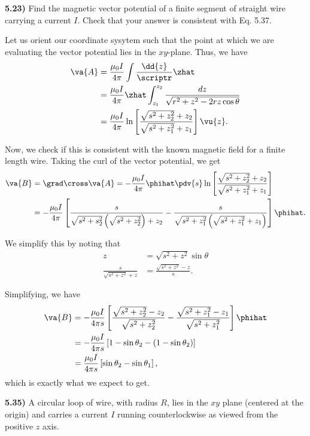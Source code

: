 \documentclass[12pt,a4paper]{article}
\newcommand{\prob}[2]{\textbf{#1)} #2}
\begin{document}
\prob{5.23}{Find the magnetic vector potential of a finite segment of straight wire carrying a current $I$. Check that your answer is consistent with Eq. 5.37.}

Let us orient our coordinate sysytem such that the point at which we are evaluating the vector potential lies in the $xy$-plane.
Thus, we have
\begin{align*}
    \va{A} &= \frac{\mu_0 I}{4 \pi} \int \frac{\dd{z}}{\scriptr} \zhat \\
           &= \frac{\mu_0 I}{4 \pi} \zhat \int_{z_1}^{z_2} \frac{dz}{\sqrt{r^2 + z^2 - 2rz\cos{\theta}}} \\
           &= \frac{\mu_0 I}{4 \pi}\ln\left[ \frac{\sqrt{s^2 + z_2^2} + z_2}{\sqrt{s^2 + z_1^2} + z_1} \right] \vu{z}
.\end{align*}

Now, we check if this is consistent with the known magnetic field for a finite length wire.
Taking the curl of the vector potential, we get
\begin{align*}
    \va{B} &= \grad \cross \va{A} = -\frac{\mu_0 I}{4 \pi} \phihat \pdv{s} \ln\left[ \frac{\sqrt{s^2 + z_2^2} + z_2}{\sqrt{s^2 + z_1^2} + z_1} \right] \\
           &= -\frac{\mu_0 I}{4 \pi}\left[ \frac{s}{\sqrt{s^2 + s_2^2}\left( \sqrt{s^2 + z_2^2} \right) + z_2} - \frac{s}{\sqrt{s^2 + z_1^2}\left( \sqrt{s^2 + z_1^2} + z_1 \right)} \right] \phihat
.\end{align*}

We simplify this by noting that 
\begin{align*}
    z &= \sqrt{s^2 + z^2}\sin{\theta} \\
    \frac{s}{\sqrt{s^2 + z^2} + z} &= \frac{\sqrt{s^2 + z^2} - z}{s}
.\end{align*}

Simplifying, we have
\begin{align*}
    \va{B} &= -\frac{\mu_0 I}{4 \pi s}\left[ \frac{\sqrt{s^2 + z_2^2} - z_2}{\sqrt{s^2 + z_2^2}}  - \frac{\sqrt{s^2 + z_1^2} - z_1}{\sqrt{s^2 + z_1^2}} \right] \phihat \\
           &= -\frac{\mu_0 I}{4 \pi s} \left[ 1 - \sin{\theta_2} - \left( 1 - \sin{\theta_2} \right)\right] \\
           &= \frac{\mu_0 I}{4 \pi s}\left[ \sin{\theta_2} - \sin{\theta_1} \right]
,\end{align*}
which is exactly what we expect to get.

\prob{5.35}{A circular loop of wire, with radius $R$, lies in the $xy$ plane (centered at the origin) and carries a current $I$ running counterlockwise as viewed from the positive $z$ axis.}
\end{document}
